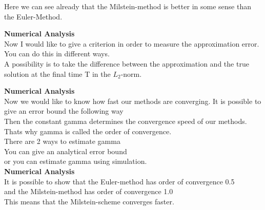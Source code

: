 \documentclass[10pt,a4paper,titlepage, openany]{memoir} %
\begin{document}
Here we can see already that the Milstein-method is better in some sense than the Euler-Method.

\textbf{Numerical Analysis}\\
Now I would like to give a criterion in order to measure the approximation error.\\
You can do this in different ways.\\
A possibility is to take the difference between the approximation and the true solution at the final time T in the \(L_2\)-norm.

\textbf{Numerical Analysis}\\
Now we would like to know how fast our methods are converging. It is possible to give an error bound the following way\\
Then the constant gamma determines the convergence speed of our methods. Thats why gamma is called the order of convergence.\\
There are 2 ways to estimate gamma\\
You can give an analytical error bound\\
or you can estimate gamma using simulation.\\


\textbf{Numerical Analysis}\\
It is possible to show that the Euler-method has order of convergence 0.5\\
and the Milstein-method has order of convergence 1.0\\
This means that the Milstein-scheme converges faster.
\end{document}
